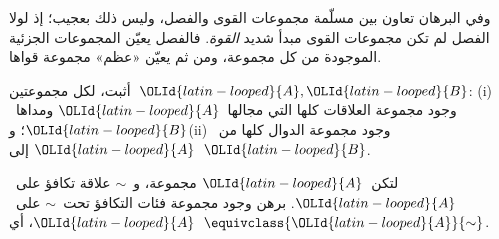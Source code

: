 \documentclass[../../../include/open-logic-section]{subfiles}
\begin{document}
وفي البرهان تعاون بين مسلّمة مجموعات القوى والفصل، وليس ذلك بعجيب؛ إذ
لولا الفصل لم تكن مجموعات القوى مبدأ شديد \emph{القوة}. فالفصل يعيّن
المجموعات الجزئية الموجودة من كل مجموعة، ومن ثم يعيّن «عظم» مجموعة
قواها.

\begin{prob}
أثبت، لكل مجموعتين~$\OLId{latin-looped}{A},\OLId{latin-looped}{B}$: (i) وجود مجموعة العلاقات كلها التي مجالها~$\OLId{latin-looped}{A}$
ومداها~$\OLId{latin-looped}{B}$؛ و(ii) وجود مجموعة الدوال كلها من~$\OLId{latin-looped}{A}$ إلى~$\OLId{latin-looped}{B}$.
\end{prob}

\begin{prob}
لتكن~$\OLId{latin-looped}{A}$ مجموعة، و~$\sim$ علاقة تكافؤ على~$\OLId{latin-looped}{A}$. برهن وجود مجموعة فئات
التكافؤ تحت~$\sim$ على~$\OLId{latin-looped}{A}$، أي~$\equivclass{\OLId{latin-looped}{A}}{\sim}$.
\end{prob}
\end{document}

